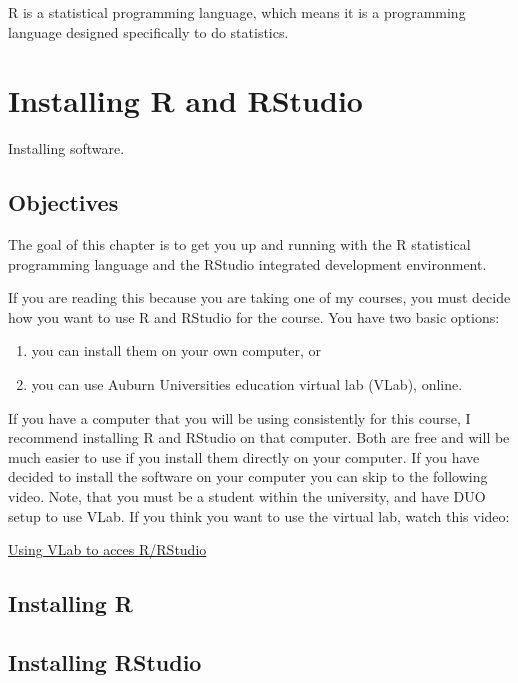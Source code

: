 \documentclass[
]{book}
\providecommand{\tightlist}{%
  \setlength{\itemsep}{0pt}\setlength{\parskip}{0pt}}
\begin{document}
R is a statistical programming language, which means it is a programming language designed specifically to do statistics.

\hypertarget{install}{%
\chapter{Installing R and RStudio}\label{install}}

Installing software.

\hypertarget{objectives}{%
\section{Objectives}\label{objectives}}

The goal of this chapter is to get you up and running with the R statistical programming language and the RStudio integrated development environment.

If you are reading this because you are taking one of my courses, you must decide how you want to use R and RStudio for the course.
You have two basic options:

\begin{enumerate}
\def\labelenumi{\arabic{enumi}.}
\tightlist
\item
  you can install them on your own computer, or
\item
  you can use Auburn Universities education virtual lab (VLab), online.
\end{enumerate}

If you have a computer that you will be using consistently for this course, I recommend installing R and RStudio on that computer.
Both are free and will be much easier to use if you install them directly on your computer.
If you have decided to install the software on your computer you can skip to the following video.
Note, that you must be a student within the university, and have DUO setup to use VLab.
If you think you want to use the virtual lab, watch this video:

\href{https://nv.instructuremedia.com/fetch/QkFoYkIxc0hhUVNIRGFrSE1Hd3JCeWhUREdFPS0tZjk4ODFlYWEyZWFiNWQwYWYyZDk0YTZjMjljZTJlMjBkNmIwMzE5Yw.mp4}{Using VLab to acces R/RStudio}

\hypertarget{installing-r}{%
\section{Installing R}\label{installing-r}}

\hypertarget{installing-rstudio}{%
\section{Installing RStudio}\label{installing-rstudio}}
\end{document}
